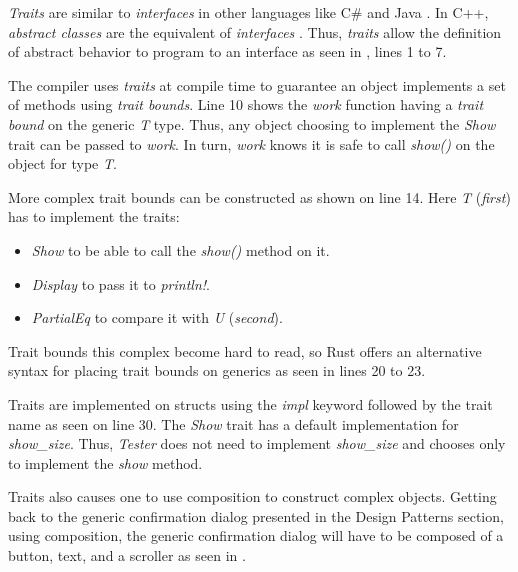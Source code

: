 \textit{Traits} are similar \cite{klabnik_2019_01} to \textit{interfaces} in other languages like C\# \cite{robinson_04_01} and Java \cite{gosling_96_01}.
In C++, \textit{abstract classes} are the equivalent of \textit{interfaces} \cite{malik_09_01,stroustrup_13_01,alexandrescu_01_01}.
Thus, \textit{traits} allow the definition of abstract behavior to program to an interface as seen in , lines 1 to 7.


The compiler uses \textit{traits} at compile time to guarantee an object implements a set of methods using \textit{trait bounds}.
Line 10 shows the \textit{work} function having a \textit{trait bound} on the generic \textit{T} type.
Thus, any object choosing to implement the \textit{Show} trait can be passed to \textit{work}.
In turn, \textit{work} knows it is safe to call \textit{show()} on the object for type \textit{T}.

More complex trait bounds can be constructed as shown on line 14.
Here \textit{T} (\textit{first}) has to implement the traits:
\begin{itemize}
	\item \textit{Show} to be able to call the \textit{show()} method on it.
	\item \textit{Display} to pass it to \textit{println!}.
	\item \textit{PartialEq} to compare it with \textit{U} (\textit{second}).
\end{itemize}

Trait bounds this complex become hard to read, so Rust offers an alternative syntax for placing trait bounds on generics as seen in lines 20 to 23.

Traits are implemented on structs using the \textit{impl} keyword followed by the trait name as seen on line 30.
The \textit{Show} trait has a default implementation for \textit{show\_size}.
Thus, \textit{Tester} does not need to implement \textit{show\_size} and chooses only to implement the \textit{show} method.

Traits also causes one to use composition to construct complex objects.
Getting back to the generic confirmation dialog presented in the Design Patterns section, using composition, the generic confirmation dialog will have to be composed of a button, text, and a scroller as seen in .

